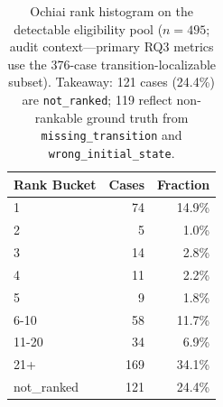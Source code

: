 \begin{table}[t]
\caption{Ochiai rank histogram on the detectable eligibility pool ($n=495$; audit context---primary RQ3 metrics use the 376-case transition-localizable subset).
Takeaway: 121 cases (24.4\%) are \texttt{not\_ranked}; 119 reflect non-rankable ground truth from \texttt{missing\_transition} and \texttt{wrong\_initial\_state}.}
\label{tab:localization-rank-distribution}
\begin{tabular}{@{}lrr@{}}
\toprule
Rank Bucket & Cases & Fraction \\
\midrule
1 & 74 & 14.9\% \\
2 & 5 & 1.0\% \\
3 & 14 & 2.8\% \\
4 & 11 & 2.2\% \\
5 & 9 & 1.8\% \\
6-10 & 58 & 11.7\% \\
11-20 & 34 & 6.9\% \\
21+ & 169 & 34.1\% \\
not\_ranked & 121 & 24.4\% \\
\bottomrule
\end{tabular}
\end{table}
